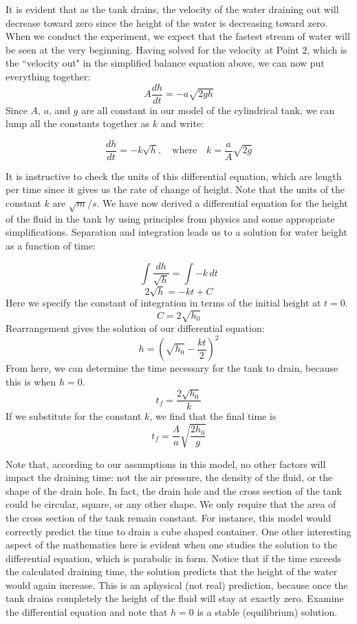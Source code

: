 \documentclass{ximera}
\begin{document}
 It is evident that as the tank drains, the velocity of the water draining out will decrease toward zero since the height of the water is decreasing toward zero.  When we conduct the experiment, we expect that the fastest stream of water will be seen at the very beginning.  Having solved for the velocity at Point 2, which is the ``velocity out" in the simplified balance equation above, we can now put everything together:
 $$A\frac{dh}{dt}=-a\sqrt{2gh}$$
 Since $A$, $a$, and $g$ are all constant in our model of the cylindrical tank, we can lump all the constants together as $k$ and write:
  
 $$\frac{dh}{dt}=-k\sqrt{h},\quad \text{where}\quad k=\frac{a}{A}\sqrt{2g}$$
 
It is instructive to check the units of this differential equation, which are length per time since it gives us the rate of change of height.  Note that the units of the constant $k$ are $\sqrt{m}/s$.  We have now derived a differential equation for the height of the fluid in the tank by using principles from physics and some appropriate simplifications. 
Separation and integration leads us to a solution for water height as a function of time:
 
$$\int\frac{dh}{\sqrt{h}}=\int -k\,dt$$
$$2\sqrt{h}=-kt+C$$
Here we specify the constant of integration in terms of the initial height at $t=0$.
$$C=2\sqrt{h_0}$$
Rearrangement gives the solution of our differential equation:
$$h=\left(\sqrt{h_0}-\frac{kt}{2}\right)^2$$
From here, we can determine the time necessary for the tank to drain, because this is when $h=0$.
$$t_f=\frac{2\sqrt{h_0}}{k}$$
If we substitute for the constant $k$, we find that the final time is
$$t_f=\frac{A}{a}\sqrt{\frac{2h_0}{g}}$$

Note that, according to our assumptions in this model, no other factors will impact the draining time: not the air pressure, the density of the fluid, or the shape of the drain hole.  In fact, the drain hole and the cross section of the tank could be circular, square, or any other shape.  We only require that the area of the cross section of the tank remain constant.  For instance, this model would correctly predict the time to drain a cube shaped container.
One other interesting aspect of the mathematics here is evident when one studies the solution to the differential equation, which is parabolic in form.  Notice that if the time exceeds the calculated draining time, the solution predicts that the height of the water would again increase.  This is an aphysical (not real) prediction, because once the tank drains completely the height of the fluid will stay at exactly zero.  Examine the differential equation and note that $h=0$ is a stable (equilibrium) solution.
 
\end{document}
